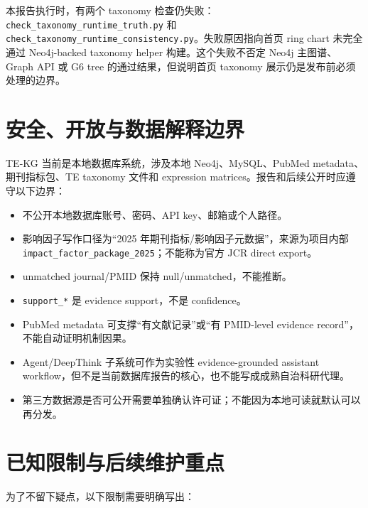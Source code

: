 \documentclass[12pt,a4paper,UTF8]{ctexart}
\newcommand{\code}[1]{\texttt{#1}}
\begin{document}
本报告执行时，有两个 taxonomy 检查仍失败：\code{check\_taxonomy\_runtime\_truth.py} 和 \code{check\_taxonomy\_runtime\_consistency.py}。失败原因指向首页 ring chart 未完全通过 Neo4j-backed taxonomy helper 构建。这个失败不否定 Neo4j 主图谱、Graph API 或 G6 tree 的通过结果，但说明首页 taxonomy 展示仍是发布前必须处理的边界。

\section{安全、开放与数据解释边界}

TE-KG 当前是本地数据库系统，涉及本地 Neo4j、MySQL、PubMed metadata、期刊指标包、TE taxonomy 文件和 expression matrices。报告和后续公开时应遵守以下边界：

\begin{itemize}
  \item 不公开本地数据库账号、密码、API key、邮箱或个人路径。
  \item 影响因子写作口径为“2025 年期刊指标/影响因子元数据”，来源为项目内部 \code{impact\_factor\_package\_2025}；不能称为官方 JCR direct export。
  \item unmatched journal/PMID 保持 null/unmatched，不能推断。
  \item \code{support\_*} 是 evidence support，不是 confidence。
  \item PubMed metadata 可支撑“有文献记录”或“有 PMID-level evidence record”，不能自动证明机制因果。
  \item Agent/DeepThink 子系统可作为实验性 evidence-grounded assistant workflow，但不是当前数据库报告的核心，也不能写成成熟自治科研代理。
  \item 第三方数据源是否可公开需要单独确认许可证；不能因为本地可读就默认可以再分发。
\end{itemize}

\section{已知限制与后续维护重点}

为了不留下疑点，以下限制需要明确写出：
\end{document}
